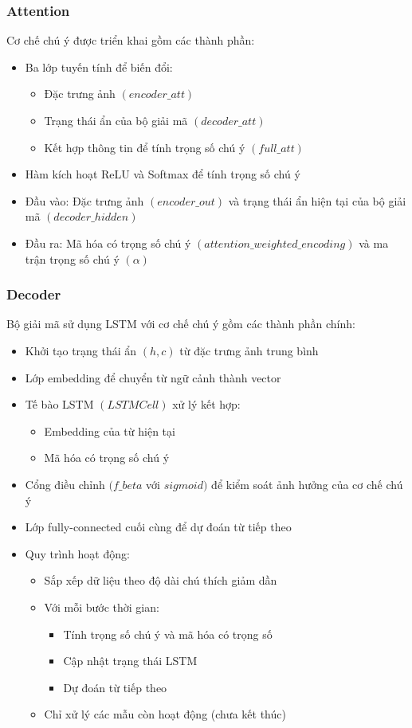 \documentclass[conference]{IEEEtran}
\begin{document}
\subsubsection{Attention}
Cơ chế chú ý được triển khai gồm các thành phần:
\begin{itemize}
    \item Ba lớp tuyến tính để biến đổi:
    \begin{itemize}
        \item Đặc trưng ảnh $(encoder\_att)$
        \item Trạng thái ẩn của bộ giải mã $(decoder\_att)$
        \item Kết hợp thông tin để tính trọng số chú ý $(full\_att)$
    \end{itemize}
    \item Hàm kích hoạt ReLU và Softmax để tính trọng số chú ý
    \item Đầu vào: Đặc trưng ảnh $(encoder\_out)$ và trạng thái ẩn hiện tại của bộ giải mã $(decoder\_hidden)$
    \item Đầu ra: Mã hóa có trọng số chú ý $(attention\_weighted\_encoding)$ và ma trận trọng số chú ý $(\alpha)$
\end{itemize}

\subsubsection{Decoder}
Bộ giải mã sử dụng LSTM với cơ chế chú ý gồm các thành phần chính:
\begin{itemize}
    \item Khởi tạo trạng thái ẩn $(h, c)$ từ đặc trưng ảnh trung bình
    \item Lớp embedding để chuyển từ ngữ cảnh thành vector
    \item Tế bào LSTM $(LSTMCell)$ xử lý kết hợp:
    \begin{itemize}
        \item Embedding của từ hiện tại
        \item Mã hóa có trọng số chú ý
    \end{itemize}
    \item Cổng điều chỉnh $(f\_beta$ với $sigmoid)$ để kiểm soát ảnh hưởng của cơ chế chú ý
    \item Lớp fully-connected cuối cùng để dự đoán từ tiếp theo
    \item Quy trình hoạt động:
    \begin{itemize}
        \item Sắp xếp dữ liệu theo độ dài chú thích giảm dần
        \item Với mỗi bước thời gian:
        \begin{itemize}
            \item Tính trọng số chú ý và mã hóa có trọng số
            \item Cập nhật trạng thái LSTM
            \item Dự đoán từ tiếp theo
        \end{itemize}
        \item Chỉ xử lý các mẫu còn hoạt động (chưa kết thúc)
    \end{itemize}
\end{itemize}
\end{document}
